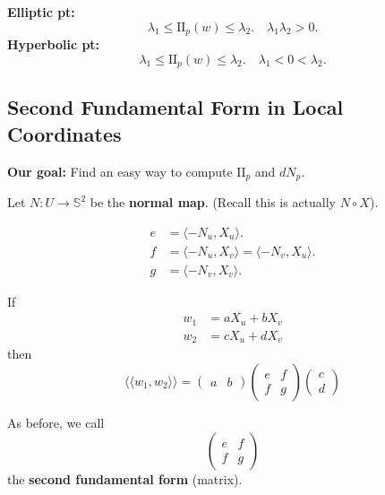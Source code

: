 \documentclass{article}
\begin{document}
\begin{remark}
\textbf{Elliptic pt:}
$$ \lambda_1 \le \mathrm{II}_p(w) \le \lambda_2. \quad \lambda_1 \lambda_2 > 0. $$
\textbf{Hyperbolic pt:}
$$ \lambda_1 \le \mathrm{II}_p(w) \le \lambda_2. \quad \lambda_1 < 0 < \lambda_2. $$
\end{remark}

\subsection{Second Fundamental Form in Local Coordinates}

\begin{remark}
\textbf{Our goal:} Find an easy way to compute $\mathrm{II}_p$ and $dN_p$.
\end{remark}

\begin{definition}
Let $N: U \to \mathbb{S}^2$ be the \textbf{normal map}.
(Recall this is actually $N \circ X$).
\end{definition}

\begin{definition}
\begin{align*}
e &= \langle -N_u, X_u \rangle. \\
f &= \langle -N_u, X_v \rangle = \langle -N_v, X_u \rangle. \\
g &= \langle -N_v, X_v \rangle.
\end{align*}
\end{definition}

\begin{proposition}
If
\begin{align*}
w_1 &= a X_u + b X_v \\
w_2 &= c X_u + d X_v
\end{align*}
then
$$ \langle\langle w_1, w_2 \rangle\rangle = \begin{pmatrix} a & b \end{pmatrix} \begin{pmatrix} e & f \\ f & g \end{pmatrix} \begin{pmatrix} c \\ d \end{pmatrix} $$
\end{proposition}

\begin{remark}
As before, we call
$$ \begin{pmatrix} e & f \\ f & g \end{pmatrix} $$
the \textbf{second fundamental form} (matrix).
\end{remark}
\end{document}

